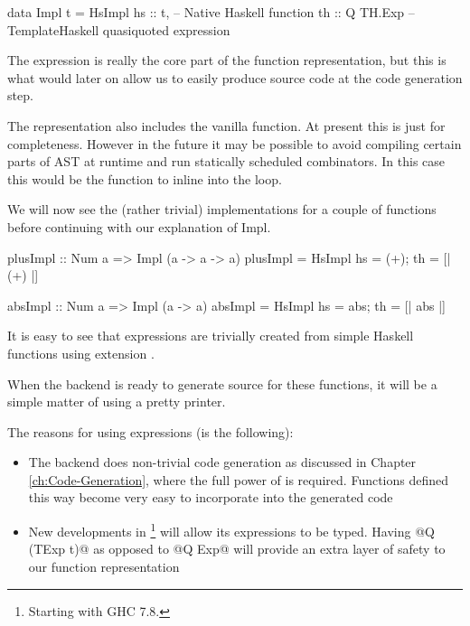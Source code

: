 \documentclass[preamble.tex]{subfiles}
\begin{document}
\begin{hscode}
data Impl t = HsImpl {
                hs :: t,        -- Native Haskell function
                th :: Q TH.Exp  -- TemplateHaskell quasiquoted expression
              } 
\end{hscode}


The  expression is really the core part of the function representation, but this is what would later on allow us to easily produce \Haskell source code at the code generation step.

The representation also includes the vanilla \Haskell function. At present this is just for completeness. However in the future it may be possible to avoid compiling certain parts of AST at runtime and run statically scheduled combinators. In this case this would be the function to inline into the loop.

We will now see the (rather trivial) implementations for a couple of functions before continuing with our explanation of Impl.

\begin{hscode}
plusImpl :: Num a => Impl (a -> a -> a)
plusImpl = HsImpl { hs = (+); th = [| (+) |] } 

absImpl :: Num a => Impl (a -> a)
absImpl = HsImpl { hs = abs; th = [| abs |] } 
\end{hscode}

It is easy to see that  expressions are trivially created from simple Haskell functions using  extension \cite{QQ}.

When the backend is ready to generate \Haskell source for these functions, it will be a simple matter of using a  pretty printer. 

The reasons for using  expressions (is the following):
\begin{itemize}
\item The backend does non-trivial code generation as discussed in Chapter \ref{ch:Code-Generation}, where the full power of  is required. Functions defined this way become very easy to incorporate into the generated code
\item New developments in \footnote{Starting with GHC 7.8.} will allow its expressions to be typed. Having @Q (TExp t)@ as opposed to @Q Exp@ will provide an extra layer of safety to our function representation
\end{itemize}
\end{document}
